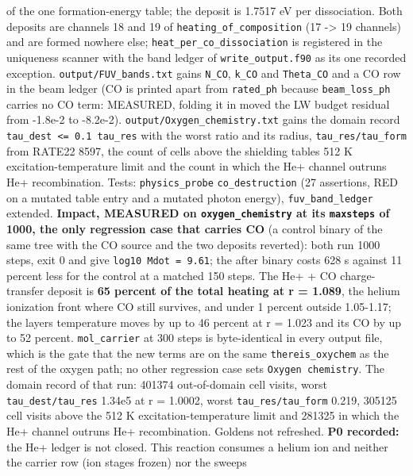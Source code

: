 \documentclass[english,a4paper]{my_memo}
\begin{document}
\begin{itemize}
  of the one formation-energy table; the deposit is 1.7517 eV per
  dissociation. Both deposits are channels 18 and 19 of
  \texttt{heating\_of\_composition} (17 -\textgreater{} 19 channels) and are formed nowhere else;
  \texttt{heat\_per\_co\_dissociation} is registered in the uniqueness scanner with
  the band ledger of \texttt{write\_output.f90} as its one recorded exception.
  \texttt{output/FUV\_bands.txt} gains \texttt{N\_CO}, \texttt{k\_CO} and \texttt{Theta\_CO} and a CO row in
  the beam ledger (CO is printed apart from \texttt{rated\_ph} because
  \texttt{beam\_loss\_ph} carries no CO term: MEASURED, folding it in moved the LW
  budget residual from -1.8e-2 to -8.2e-2). \texttt{output/Oxygen\_chemistry.txt}
  gains the domain record \texttt{tau\_dest\ \textless{}=\ 0.1\ tau\_res} with the worst ratio and
  its radius, \texttt{tau\_res/tau\_form} from RATE22 8597, the count of cells above
  the shielding table\textquotesingle s 512 K excitation-temperature limit and the count in
  which the He+ channel outruns He+ recombination. Tests: \texttt{physics\_probe}
  \texttt{co\_destruction} (27 assertions, RED on a mutated table entry and a
  mutated photon energy), \texttt{fuv\_band\_ledger} extended.
  \textbf{Impact, MEASURED on \texttt{oxygen\_chemistry} at its \texttt{maxsteps} of 1000, the
  only regression case that carries CO} (a control binary of the same tree
  with the CO source and the two deposits reverted): both run 1000 steps,
  exit 0 and give \texttt{log10\ Mdot\ =\ 9.61}; the after binary costs 628 s against
  11 percent less for the control at a matched 150 steps. The He+ + CO
  charge-transfer deposit is \textbf{65 percent of the total heating at
  r = 1.089}, the helium ionization front where CO still survives, and
  under 1 percent outside 1.05-1.17; the layer\textquotesingle s temperature moves by up to
  46 percent at r = 1.023 and its CO by up to 52 percent. \texttt{mol\_carrier} at
  300 steps is byte-identical in every output file, which is the gate that
  the new terms are on the same \texttt{thereis\_oxychem} as the rest of the oxygen
  path; no other regression case sets \texttt{Oxygen\ chemistry}. The domain record
  of that run: 401374 out-of-domain cell visits, worst \texttt{tau\_dest/tau\_res}
  1.34e5 at r = 1.0002, worst \texttt{tau\_res/tau\_form} 0.219, 305125 cell visits
  above the 512 K excitation-temperature limit and 281325 in which the He+
  channel outruns He+ recombination. Goldens not refreshed.
  \textbf{P0 recorded:} the He+ ledger is not closed. This reaction consumes a
  helium ion and neither the carrier row (ion stages frozen) nor the sweep\textquotesingle s

\end{itemize}
\end{document}
